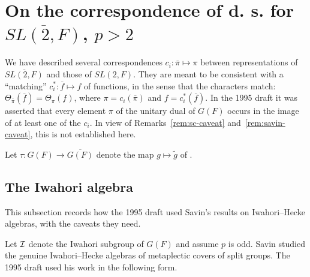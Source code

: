 \documentclass[12pt,letterpaper,openany]{book}
\theoremstyle{plain}
\theoremstyle{definition}
\theoremstyle{remark}
\theoremstyle{remark}
\begin{document}








\section{On the correspondence of d. s. for
\texorpdfstring{$\overline{SL(2,F)}$}{SL(2,F)-bar}, \texorpdfstring{$p>2$}{p>2}}\label{sec:padic-ds}

We have described several correspondences
$c_i:\overline{\pi}\longmapsto \pi$
between representations of
$\overline{SL(2,F)}$ and those of $SL(2,F)$. They are meant to be
consistent with a ``matching''
$c_i^*:\overline{f}\longmapsto f$
of functions, in the sense that the characters match:
$\Theta_{\overline{\pi}}(\overline{f})=\Theta_{\pi}(f)$, where
$\pi=c_i(\overline{\pi})$ and $f=c_i^*(\overline{f})$.
In the 1995 draft it was asserted that every element $\pi$ of the
unitary dual of $G(F)$ occurs in the image of at
least one of the $c_i$. In view of Remarks~\ref{rem:sc-caveat}
and~\ref{rem:savin-caveat}, this is not established here.

Let $\tau:G(F)\rightarrow \overline{G(F)}$ denote the map
$g\longmapsto \tilde{g}$ of \cite{Fl}.

\subsection{The Iwahori algebra}

This subsection records how the 1995 draft used Savin's results on Iwahori--Hecke algebras, with the caveats they need.


Let ${\cal I}$ denote the Iwahori subgroup of $G(F)$ and assume $p$ is odd.
Savin \cite{Sav} studied the genuine Iwahori--Hecke algebras of
metaplectic covers of split groups. The 1995 draft used his work in the
following form.
\end{document}
